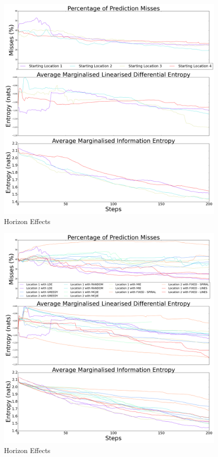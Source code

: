 \documentclass{article}
\begin{document}
		\begin{figure}[!htbp]
		\centering
			\includegraphics[width = \linewidth]{Figures/compare_locations.png}
		\caption{Horizon Effects}
		\label{Figure:Results:CompareLocations}
		\end{figure}
		
		\begin{figure}[!htbp]
		\centering
			\includegraphics[width = \linewidth]{Figures/compare_methods.png}
		\caption{Horizon Effects}
		\label{Figure:Results:CompareMethods}
		\end{figure}
				
\end{document}

